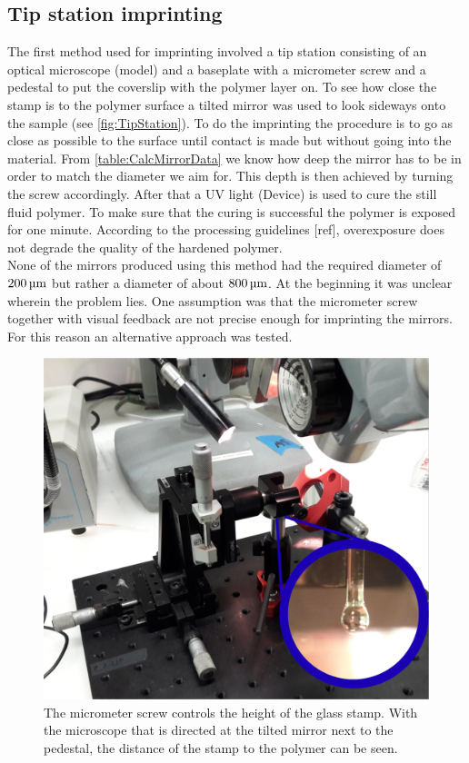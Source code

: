 \subsection{Tip station imprinting}
The first method used for imprinting involved a tip station consisting of an optical microscope (model) and a baseplate with a micrometer screw and a pedestal to put the coverslip with the polymer layer on. To see how close the stamp is to the polymer surface a tilted mirror was used to look sideways onto the sample (see \autoref{fig:TipStation}). To do the imprinting the procedure is to go as close as possible to the surface until contact is made but without going into the material. From \autoref{table:CalcMirrorData} we know how deep the mirror has to be in order to match the diameter we aim for. This depth is then achieved by turning the screw accordingly. After that a UV light (Device) is used to cure the still fluid polymer. To make sure that the curing is successful the polymer is exposed for one minute. According to the processing guidelines [ref], overexposure does not degrade the quality of the hardened polymer.\\
None of the mirrors produced using this method had the required diameter of $200\um$ but rather a diameter of about $800\um$.  At the beginning it was unclear wherein the problem lies. One assumption was that the micrometer screw together with visual feedback are not precise enough for imprinting the mirrors. For this reason an alternative approach was tested.

\begin{figure}[H]
	\includegraphics[scale=0.6]{source/tip_station}
	\caption{The micrometer screw controls the height of the glass stamp. With the microscope that is directed at the tilted mirror next to the pedestal, the distance of the stamp to the polymer can be seen.}
	\label{fig:TipStation}
\end{figure}

